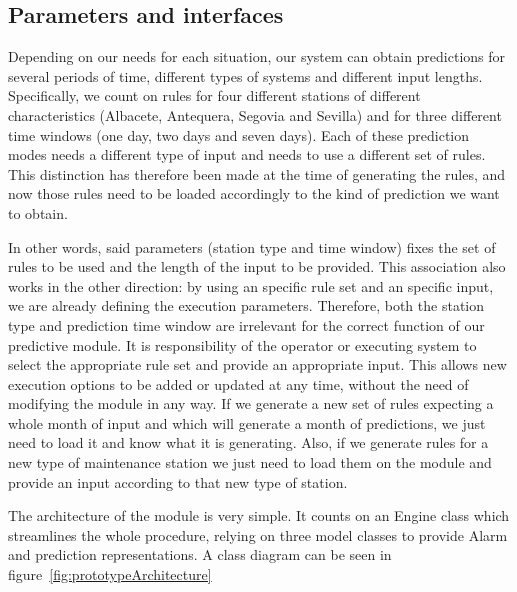 \documentclass[a4paper,12pt]{article}
\begin{document}
\subsection{Parameters and interfaces}
\label{sec:parameters_and_interfaces}
Depending on our needs for each situation, our system can obtain predictions for several periods of time, different types of systems and different input lengths. Specifically, we count on rules for four different stations of different characteristics (Albacete, Antequera, Segovia and Sevilla) and for three different time windows (one day, two days and seven days). Each of these prediction modes needs a different type of input and needs to use a different set of rules. This distinction has therefore been made at the time of generating the rules, and now those rules need to be loaded accordingly to the kind of prediction we want to obtain.

In other words, said parameters (station type and time window) fixes the set of rules to be used and the length of the input to be provided. This association also works in the other direction: by using an specific rule set and an specific input, we are already defining the execution parameters. Therefore, both the station type and prediction time window are irrelevant for the correct function of our predictive module. It is responsibility of the operator or executing system to select the appropriate rule set and provide an appropriate input. This allows new execution options to be added or updated at any time, without the need of modifying the module in any way. If we generate a new set of rules expecting a whole month of input and which will generate a month of predictions, we just need to load it and know what it is generating. Also, if we generate rules for a new type of maintenance station we just need to load them on the module and provide an input according to that new type of station.

The architecture of the module is very simple. It counts on an Engine class which streamlines the whole procedure, relying on three model classes to provide Alarm and prediction representations. A class diagram can be seen in figure~\ref{fig:prototypeArchitecture}
\end{document}
